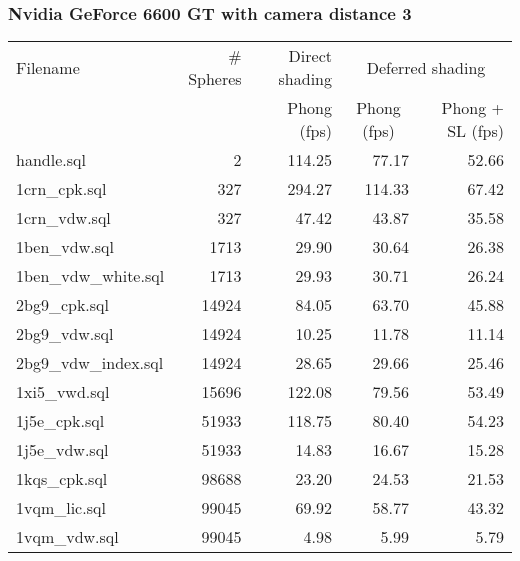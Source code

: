 \subsubsection*{Nvidia GeForce 6600 GT with camera distance 3}
\begin{tabular}{|l|r|r|r|r|}
\hline
Filename & \# Spheres & Direct shading & \multicolumn{2}{|c|}{Deferred shading} \\
         &            & Phong (fps)    & \multicolumn{1}{|c}{Phong (fps)} & Phong + SL (fps) \\  
\hline
\hline
handle.sql & 2 & 114.25 & 77.17 & 52.66 \\
\hline
1crn\_cpk.sql & 327 & 294.27 & 114.33 & 67.42 \\
\hline
1crn\_vdw.sql & 327 & 47.42 & 43.87 & 35.58 \\
\hline
1ben\_vdw.sql & 1713 & 29.90 & 30.64 & 26.38 \\
\hline
1ben\_vdw\_white.sql & 1713 & 29.93 & 30.71 & 26.24 \\
\hline
2bg9\_cpk.sql & 14924 & 84.05 & 63.70 & 45.88 \\
\hline
2bg9\_vdw.sql & 14924 & 10.25 & 11.78 & 11.14 \\
\hline
2bg9\_vdw\_index.sql & 14924 & 28.65 & 29.66 & 25.46 \\
\hline
1xi5\_vwd.sql & 15696 & 122.08 & 79.56 & 53.49 \\
\hline
1j5e\_cpk.sql & 51933 & 118.75 & 80.40 & 54.23 \\
\hline
1j5e\_vdw.sql & 51933 & 14.83 & 16.67 & 15.28 \\
\hline
1kqs\_cpk.sql & 98688 & 23.20 & 24.53 & 21.53 \\
\hline
1vqm\_lic.sql & 99045 & 69.92 & 58.77 & 43.32 \\
\hline
1vqm\_vdw.sql & 99045 & 4.98 & 5.99 & 5.79 \\
\hline
\end{tabular}
